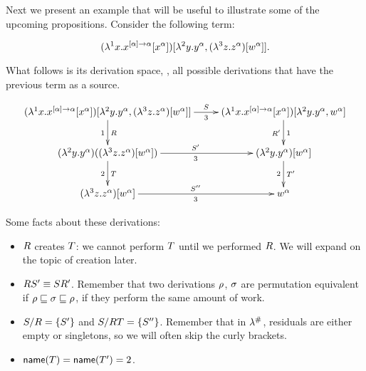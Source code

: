 \bigskip
\begin{example}
Next we present an example that will be useful to illustrate
some of the upcoming propositions. Consider the following term:

\[
  (\lambda^{1} x. x^{[\alpha] \to \alpha} [x^\alpha])
    [\lambda^{2} y. y^\alpha,
    (\lambda^{3} z. z^\alpha) [w^\alpha]].
\]

What follows is its derivation space, \ie,
all possible derivations that have the previous term as a source.

\[
\xymatrix{
  (\lamp{1}{\var}{\var^{[\alpha] \to \alpha} [\var^\alpha])}
    [\lamp{2}{\vartwo}{\vartwo^\alpha},
    (\lamp{3}{\varthree}{\varthree^\alpha}) [w^\alpha]]
    \ar@[->][r]_-{3}^-{\redextwo}
    \ar@[->][d]_{1}^{\redex}
  &
  (\lamp{1}{\var}{\var^{[\alpha] \to \alpha} [\var^\alpha])}
    [\lamp{2}{\vartwo}{\vartwo^\alpha},
    w^\alpha]
   \ar@[->][d]^{1}_{\redex'}
  \\
  (\lamp{2}{\vartwo}{\vartwo^\alpha})
   ((\lamp{3}{\varthree}{\varthree^\alpha}) [w^\alpha])
   \ar@[->][r]_{3}^{\redextwo'}
   \ar@[->][d]_{2}^{\redexthree}
   &
  (\lamp{2}{\vartwo}{\vartwo^\alpha})  [w^\alpha]
  \ar@[->][d]_{2}^{\redexthree'}
   \\
  (\lamp{3}{\varthree}{\varthree^\alpha})  [w^\alpha]
  \ar@[->][r]_{3}^{\redextwo''}
  &
  w^\alpha
  }
\]
\end{example}

Some facts about these derivations:

\begin{itemize}
  \item $R$ creates $T$: we cannot perform $T$ until we performed $R$. We will expand on the topic of creation later.
  \item $R S' \equiv S R'$. Remember that two derivations $\rho$,
    $\sigma$ are permutation equivalent if $\rho \sqsubseteq \sigma \sqsubseteq \rho$,
    \ie if they perform the same amount of work.
  \item $S / R = \{S'\}$ and
    $S / R T = \{S''\}$. Remember that in $\lambda^{\mathtt{\#}}$,
    residuals are either empty or singletons, so we will often skip the curly brackets.
  \item $\mathsf{name}(T) = \mathsf{name}(T') = 2$.
\end{itemize}
